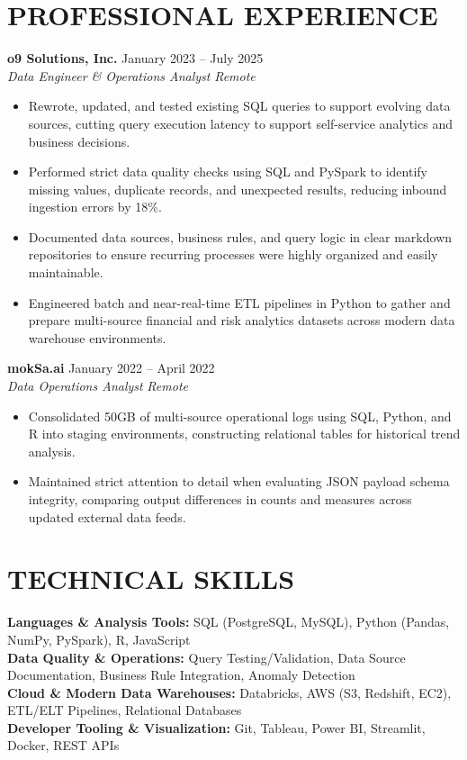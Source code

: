 \documentclass[11pt,letterpaper]{article}
\begin{document}
\section*{PROFESSIONAL EXPERIENCE}
\noindent\small \textbf{o9 Solutions, Inc.} \hfill January 2023 -- July 2025 \\
\textit{Data Engineer \& Operations Analyst} \hfill \textit{Remote}
\begin{itemize}
\item Rewrote, updated, and tested existing SQL queries to support evolving data sources, cutting query execution latency to support self-service analytics and business decisions.
\item Performed strict data quality checks using SQL and PySpark to identify missing values, duplicate records, and unexpected results, reducing inbound ingestion errors by 18\%.
\item Documented data sources, business rules, and query logic in clear markdown repositories to ensure recurring processes were highly organized and easily maintainable.
\item Engineered batch and near-real-time ETL pipelines in Python to gather and prepare multi-source financial and risk analytics datasets across modern data warehouse environments.
\end{itemize}
\noindent\small \textbf{mokSa.ai} \hfill January 2022 -- April 2022 \\
\textit{Data Operations Analyst} \hfill \textit{Remote}
\begin{itemize}
\item Consolidated 50GB of multi-source operational logs using SQL, Python, and R into staging environments, constructing relational tables for historical trend analysis.
\item Maintained strict attention to detail when evaluating JSON payload schema integrity, comparing output differences in counts and measures across updated external data feeds.
\end{itemize}
\section*{TECHNICAL SKILLS}
\noindent\small \textbf{Languages \& Analysis Tools:} SQL (PostgreSQL, MySQL), Python (Pandas, NumPy, PySpark), R, JavaScript \\
\textbf{Data Quality \& Operations:} Query Testing/Validation, Data Source Documentation, Business Rule Integration, Anomaly Detection \\
\textbf{Cloud \& Modern Data Warehouses:} Databricks, AWS (S3, Redshift, EC2), ETL/ELT Pipelines, Relational Databases \\
\textbf{Developer Tooling \& Visualization:} Git, Tableau, Power BI, Streamlit, Docker, REST APIs
\end{document}
